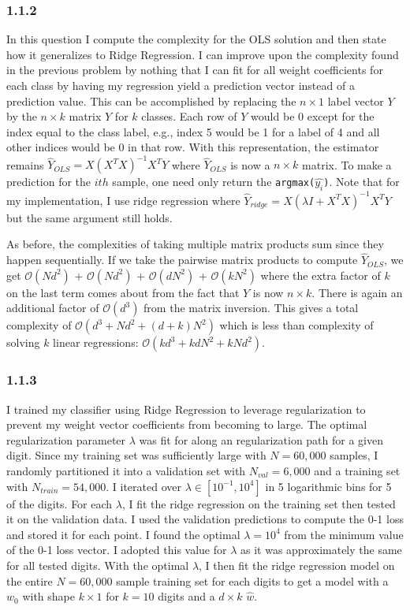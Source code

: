 \documentclass[12pt]{amsart}
\begin{document}
\subsubsection*{1.1.2}

In this question I compute the complexity for the OLS solution and then state how it generalizes to Ridge Regression.  I can improve upon the complexity found in the previous problem by nothing that I can fit for all weight coefficients for each class by having my regression yield a prediction vector instead of a prediction value.  This can be accomplished by replacing the $n \times 1$ label vector $Y$ by the $n \times k$ matrix $Y$ for $k$ classes.  Each row of $Y$ would be 0 except for the index equal to the class label, e.g., index 5 would be 1 for a label of 4 and all other indices would be 0 in that row.  With this representation, the estimator remains $\hat{Y}_{OLS} = X(X^T X)^{-1}X^T Y$ where $\hat{Y}_{OLS}$ is now a $n \times k$ matrix.  To make a prediction for the $ith$ sample, one need only return the {\tt argmax($\hat{y_i}$)}.  Note that for my implementation, I use ridge regression where $\hat{Y}_{ridge} = X(\lambda I + X^T X)^{-1}X^T Y$ but the same argument still holds.

As before, the complexities of taking multiple matrix products sum since they happen sequentially.  If we take the pairwise matrix products to compute $\hat{Y}_{OLS}$, we get $\mathcal{O}(Nd^2)$ + $\mathcal{O}(Nd^2)$ + $\mathcal{O}(dN^2)$ + $\mathcal{O}(kN^2)$ where the extra factor of $k$ on the last term comes about from the fact that $Y$ is now $n \times k$.  There is again an additional factor of $\mathcal{O}(d^3)$ from the matrix inversion.  This gives a total complexity of $\mathcal{O}(d^3 + Nd^2 + (d+k)N^2)$ which is less than complexity of solving $k$ linear regressions: $\mathcal{O}(kd^3 + kdN^2 + kNd^2)$.

\subsubsection*{1.1.3}

I trained my classifier using Ridge Regression to leverage regularization to prevent my weight vector coefficients from becoming to large.  The optimal regularization parameter $\lambda$ was fit for along an regularization path for a given digit.  Since my training set was sufficiently large with $N = 60,000$ samples, I randomly partitioned it into a validation set with $N_{val} = 6,000$ and a training set with $N_{train} = 54,000$.  I iterated over $\lambda \in [10^{-1},10^{4}]$ in 5 logarithmic bins for 5 of the digits.  For each $\lambda$, I fit the ridge regression on the training set then tested it on the validation data.  I used the validation predictions to compute the 0-1 loss and stored it for each point.  I found the optimal $\lambda = 10^4$ from the minimum value of the 0-1 loss vector.  I adopted this value for $\lambda$ as it was approximately the same for all tested digits.  With the optimal $\lambda$, I then fit the ridge regression model on the entire $N = 60,000$ sample training set for each digits to get a model with a $w_0$ with shape $k \times 1$ for $k = 10$ digits and a $d \times k$ $\hat{w}$.  
\end{document}
